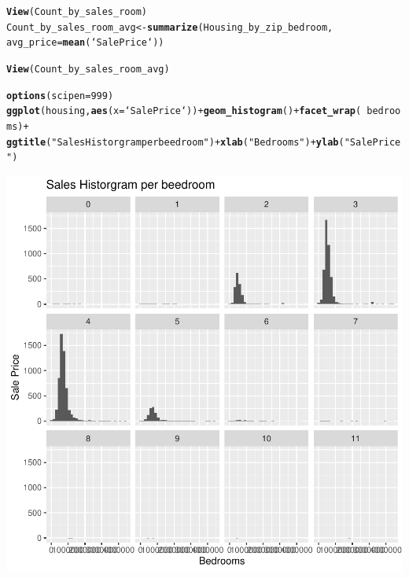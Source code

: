 \documentclass{article}\usepackage[]{graphicx}\usepackage[]{xcolor}
\makeatletter
\newcommand{\hlnum}[1]{\textcolor[rgb]{0.686,0.059,0.569}{#1}}%
\newcommand{\hlstr}[1]{\textcolor[rgb]{0.192,0.494,0.8}{#1}}%
\newcommand{\hlopt}[1]{\textcolor[rgb]{0,0,0}{#1}}%
\newcommand{\hlstd}[1]{\textcolor[rgb]{0.345,0.345,0.345}{#1}}%
\newcommand{\hlkwb}[1]{\textcolor[rgb]{0.69,0.353,0.396}{#1}}%
\newcommand{\hlkwc}[1]{\textcolor[rgb]{0.333,0.667,0.333}{#1}}%
\newcommand{\hlkwd}[1]{\textcolor[rgb]{0.737,0.353,0.396}{\textbf{#1}}}%
\newenvironment{kframe}{%
 \def\at@end@of@kframe{}%
 \ifinner\ifhmode%
  \def\at@end@of@kframe{\end{minipage}}%
  \begin{minipage}{\columnwidth}%
 \fi\fi%
 \def\FrameCommand##1{\hskip\@totalleftmargin \hskip-\fboxsep
 \colorbox{shadecolor}{##1}\hskip-\fboxsep
     \hskip-\linewidth \hskip-\@totalleftmargin \hskip\columnwidth}%
 \MakeFramed {\advance\hsize-\width
   \@totalleftmargin\z@ \linewidth\hsize
   \@setminipage}}%
 {\par\unskip\endMakeFramed%
 \at@end@of@kframe}
\newenvironment{knitrout}{}{} %
\makeatother
\begin{document}
\begin{knitrout}
\begin{kframe}
{\ttfamily\noindent\itshape\color{messagecolor}{\#\# `summarise()` has grouped output by 'zip5'. You can override using the `.groups`\\\#\# argument.}}\begin{alltt}
\hlkwd{View}\hlstd{(Count_by_sales_room)}
\hlstd{Count_by_sales_room_avg} \hlkwb{<-}\hlkwd{summarize}\hlstd{(Housing_by_zip_bedroom,}
                                    \hlkwc{avg_price} \hlstd{=} \hlkwd{mean}\hlstd{(`Sale Price`))}
\end{alltt}


{\ttfamily\noindent\itshape\color{messagecolor}{\#\# `summarise()` has grouped output by 'zip5'. You can override using the `.groups`\\\#\# argument.}}\begin{alltt}
\hlkwd{View}\hlstd{(Count_by_sales_room_avg)}

\hlkwd{options}\hlstd{(}\hlkwc{scipen} \hlstd{=} \hlnum{999}\hlstd{)}
\hlkwd{ggplot}\hlstd{(housing,} \hlkwd{aes}\hlstd{(}\hlkwc{x}\hlstd{=`Sale Price`))} \hlopt{+}\hlkwd{geom_histogram}\hlstd{()} \hlopt{+}\hlkwd{facet_wrap}\hlstd{(}\hlopt{~}\hlstd{bedrooms)}\hlopt{+}
\hlkwd{ggtitle}\hlstd{(}\hlstr{"Sales Historgram per beedroom"}\hlstd{)} \hlopt{+} \hlkwd{xlab}\hlstd{(}\hlstr{"Bedrooms"}\hlstd{)} \hlopt{+}\hlkwd{ylab}\hlstd{(}\hlstr{"Sale Price"}\hlstd{)}
\end{alltt}


{\ttfamily\noindent\itshape\color{messagecolor}{\#\# `stat\_bin()` using `bins = 30`. Pick better value with `binwidth`.}}\end{kframe}

{\centering \includegraphics[width=.6\linewidth]{figure/DSC520-week4-housing-TangXin-Rnwauto-report-1} 

}



\end{knitrout}
\end{document}
